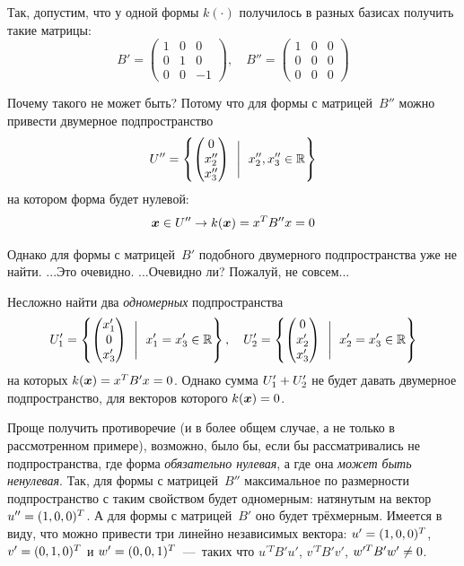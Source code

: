\documentclass[a4paper,12pt]{article}
\begin{document}
  \begin{example}
    Так, допустим, что у одной формы $k(\cdot)$ получилось в разных базисах получить такие матрицы:
    \[
      B' = \begin{pmatrix}
        1 & 0 & 0\\
        0 & 1 & 0\\
        0 & 0 & -1
      \end{pmatrix},\quad B'' = \begin{pmatrix}
        1 & 0 & 0\\
        0 & 0 & 0\\
        0 & 0 & 0
      \end{pmatrix}
    \]
    
    Почему такого не может быть?
    Потому что для формы с матрицей~$B''$ можно привести двумерное подпространство
    \[
      U'' = \left\{
        \begin{pmatrix}
          0\\
          x_2''\\
          x_3''
        \end{pmatrix}\ \Biggm|\ x_2'', x_3'' \in \operatorname{\mathbb R}
      \right\}
    \]
    на котором форма будет нулевой:
    \[
      \boldsymbol x \in U'' \to k(\boldsymbol x) = x^T B'' x = 0
    \]
    
    Однако для формы с матрицей~$B'$ подобного двумерного подпространства уже не найти.
    ...Это очевидно.
    ...Очевидно ли?
    Пожалуй, не совсем...
    
    Несложно найти два \emph{одномерных} подпространства
    \[
      U_1' = \left\{
        \begin{pmatrix}
          x_1'\\
          0\\
          x_3'
        \end{pmatrix}\ \Biggm|\ x_1' = x_3' \in \operatorname{\mathbb R}
      \right\},\quad U_2' = \left\{
        \begin{pmatrix}
          0\\
          x_2'\\
          x_3'
        \end{pmatrix}\ \Biggm|\ x_2' = x_3' \in \operatorname{\mathbb R}
      \right\}
    \]
    на которых $k(\bds x) \hm= x^T B' x \hm= 0$.
    Однако сумма $U_1' \hm+ U_2'$ не будет давать двумерное подпространство, для векторов которого $k(\bds x) \hm= 0$.
    
    Проще получить противоречие (и в более общем случае, а не только в рассмотренном примере), возможно, было бы, если бы рассматривались не подпространства, где форма \emph{обязательно нулевая}, а где она \emph{может быть ненулевая}.
    Так, для формы с матрицей~$B''$ максимальное по размерности подпространство с таким свойством будет одномерным: натянутым на вектор $u'' \hm= (1, 0, 0)^T$.
    А для формы с матрицей~$B'$ оно будет трёхмерным.
    Имеется в виду, что можно привести три линейно независимых вектора: $u' \hm= (1, 0, 0)^T$, $v' \hm= (0, 1, 0)^T$ и $w' \hm= (0, 0, 1)^T$~---~таких что $u^{\prime T} B' u'$, $v^{\prime T} B' v'$, $w^{\prime T} B' w' \hm{\not=} 0$.
  \end{example}
  
\end{document}
